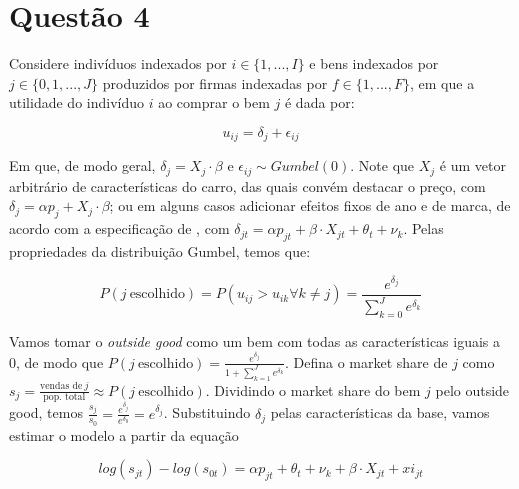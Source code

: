 \documentclass{article}
\begin{document}
\section*{Questão 4}\label{sec4}

Considere indivíduos indexados por $i \in \{1, ..., I\}$ e bens indexados por $j \in \{0, 1, ..., J\}$ produzidos por firmas indexadas por $f \in \{1, ..., F\}$, em que a utilidade do indivíduo $i$ ao comprar o bem $j$ é dada por:

\begin{equation}
    u_{ij} = \delta_j + \epsilon_{ij}
\end{equation}

Em que, de modo geral, $\delta_j = X_j \cdot \beta$ e $\epsilon_{ij} \sim Gumbel(0)$. Note que $X_j$ é um vetor arbitrário de características do carro, das quais convém destacar o preço, com $\delta_j = \alpha p_j + X_j \cdot \beta$; ou em alguns casos adicionar efeitos fixos de ano e de marca, de acordo com a especificação de , com $\delta_{jt} = \alpha p_{jt} + \beta \cdot X_{jt} + \theta_t + \nu_k$. Pelas propriedades da distribuição Gumbel, temos que:

\begin{equation}
    P( j \: \text{escolhido}) = P (u_{ij} > u_{ik} \forall k \neq j) = \frac{e^{\delta_j}}{\sum_{k = 0}^J e^{\delta_k}}
\end{equation}

Vamos tomar o \emph{outside good} como um bem com todas as características iguais a 0, de modo que $P( j \: \text{escolhido}) = \frac{e^{\delta_j}}{1 + \sum_{k = 1}^J e^{\delta_k}}$. Defina o market share de $j$ como $s_j = \frac{\text{vendas de}\:j}{\text{pop. total}} \approx P(j \: \text{escolhido})$. Dividindo o market share do bem $j$ pelo outside good, temos $\frac{s_j}{s_0} = \frac{e^{\delta_j}}{e^{\delta_0}} = e^{\delta_j}$. Substituindo $\delta_j$ pelas características da base, vamos estimar o modelo a partir da equação

\begin{equation}
    log(s_{jt}) - log(s_{0t}) = \alpha p_{jt} + \theta_t + \nu_k + \beta \cdot X_{jt} + xi_{jt} 
\end{equation}
\end{document}
